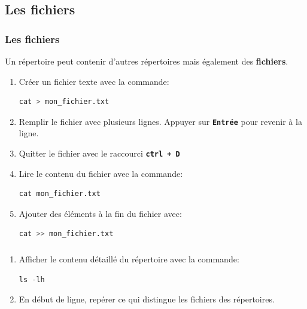 \documentclass[svgnames,11pt]{beamer}
\begin{document}
\subsection{Les fichiers}
\begin{frame}[fragile]
    \frametitle{Les fichiers}

Un répertoire peut contenir d'autres répertoires mais également des \textbf{fichiers}.
\begin{activite}
\begin{enumerate}
    \item Créer un fichier texte avec la commande:
\begin{lstlisting}[language=Python , basicstyle=\ttfamily\small, xleftmargin=2em, xrightmargin=2em]
cat > mon_fichier.txt
\end{lstlisting}
\item Remplir le fichier avec plusieurs lignes. Appuyer sur \textbf{\texttt{Entrée}} pour revenir à la ligne.
\item Quitter le fichier avec le raccourci \textbf{\texttt{ctrl + D}}
\item Lire le contenu du fichier avec la commande:
\begin{lstlisting}[language=Python , basicstyle=\ttfamily\small, xleftmargin=2em, xrightmargin=2em]
cat mon_fichier.txt
\end{lstlisting}
\item Ajouter des éléments à la fin du fichier avec:
\begin{lstlisting}[language=Python , basicstyle=\ttfamily\small, xleftmargin=2em, xrightmargin=2em]
cat >> mon_fichier.txt
\end{lstlisting}
\end{enumerate}
\end{activite}

\end{frame}
\begin{frame}[fragile]
    \frametitle{}

    \begin{activite}
    \begin{enumerate}
        \item Afficher le contenu détaillé du répertoire avec la commande:
\begin{lstlisting}[language=Python , basicstyle=\ttfamily\small, xleftmargin=2em, xrightmargin=2em]
ls -lh
\end{lstlisting}
\item En début de ligne, repérer ce qui distingue les fichiers des répertoires. 
    \end{enumerate}
    \end{activite}

\end{frame}
\end{document}
